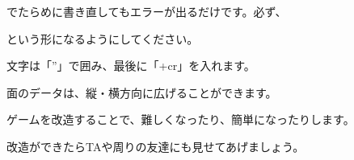 でたらめに書き直してもエラーが出るだけです。必ず、

\begin{description}
    \item {}
\end{description}

という形になるようにしてください。

文字は「”」で囲み、最後に「+cr」を入れます。

面のデータは、縦・横方向に広げることができます。


\begin{description}
    \item {}
\end{description}

ゲームを改造することで、難しくなったり、簡単になったりします。

改造ができたらTAや周りの友達にも見せてあげましょう。

